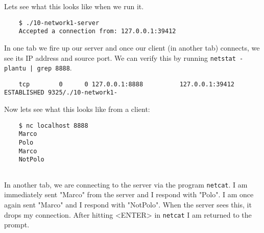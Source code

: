 \documentclass[../main.tex]{subfiles}
\begin{document}
	Lets see what this looks like when we run it.
	
	\begin{verbatim}
	$ ./10-network1-server 
	Accepted a connection from: 127.0.0.1:39412
	\end{verbatim}
	
	In one tab we fire up our server and once our client (in another tab) connects, we see its IP address and source port.  We can verify this by running \texttt{netstat -plantu | grep 8888}.  
	
	\begin{verbatim}
	tcp        0      0 127.0.0.1:8888          127.0.0.1:39412         ESTABLISHED 9325/./10-network1- 
	\end{verbatim}
	
	Now lets see what this looks like from a client:
	
	\begin{verbatim}
	$ nc localhost 8888
	Marco
	Polo
	Marco
	NotPolo
	
	\end{verbatim}
	
	In another tab, we are connecting to the server via the program \texttt{netcat}.  I am immediately sent "Marco" from the server and I respond with "Polo".  I am once again sent "Marco" and I respond with "NotPolo".  When the server sees this, it drops my connection.  After hitting <ENTER> in \texttt{netcat} I am returned to the prompt.
	
\end{document}
